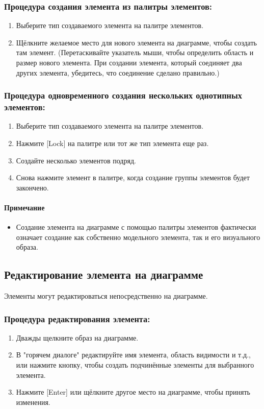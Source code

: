 \documentclass[a4paper,12pt]{report}
\begin{document}
\subsubsection*{Процедура создания элемента из палитры элементов:}
\begin{enumerate}
	\item Выберите тип создаваемого элемента на палитре элементов.
	\item Щёлкните желаемое место для нового элемента на диаграмме, чтобы создать там элемент.
	(Перетаскивайте указатель мыши, чтобы определить область и размер нового элемента. При
	создании элемента, который соединяет два других элемента, убедитесь, что соединение
	сделано правильно.)
\end{enumerate}

\subsubsection*{Процедура одновременного создания нескольких однотипных элементов:}
\begin{enumerate}
	\item Выберите тип создаваемого элемента на палитре элементов.
	\item Нажмите [Lock] на палитре или тот же тип элемента еще раз.
	\item Создайте несколько элементов подряд.
	\item Снова нажмите элемент в палитре, когда создание группы элементов будет закончено.
\end{enumerate}

\paragraph{Примечание}
\begin{itemize}
	\item Создание элемента на диаграмме с помощью палитры элементов фактически означает
	создание как собственно модельного элемента, так и его визуального образа.
\end{itemize}


\subsection*{Редактирование элемента на диаграмме}
Элементы могут редактироваться непосредственно на диаграмме.
\subsubsection*{Процедура редактирования элемента:}
\begin{enumerate}
	\item Дважды щелкните образ на диаграмме.
	\item В "горячем диалоге" редактируйте имя элемента, область видимости и т.д., или нажмите
	кнопку, чтобы создать подчинённые элементы для выбранного элемента.
	\item Нажмите [Enter] или щёлкните другое место на диаграмме, чтобы принять изменения.
\end{enumerate}
\end{document}
